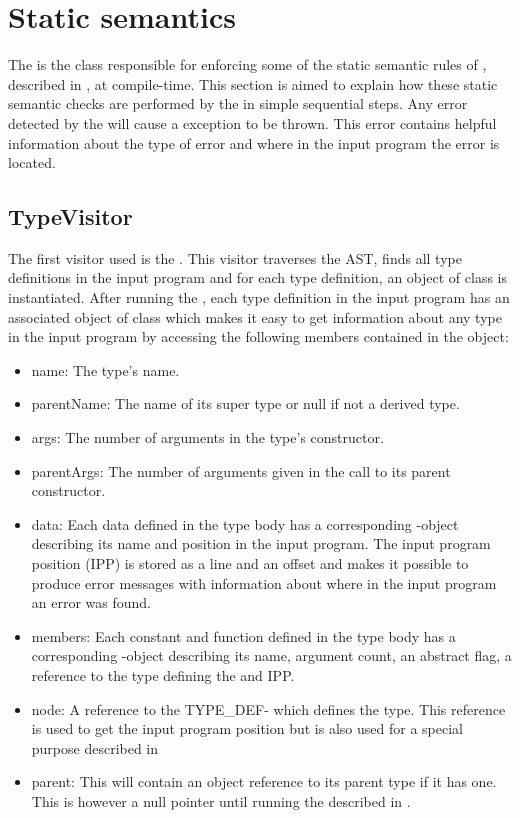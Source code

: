 \section{Static semantics}
The  is the class responsible for enforcing some of the static semantic rules of \productname{}, described in , at compile-time. This section is aimed to explain how these static semantic checks are performed by the  in simple sequential steps. Any error detected by the  will cause a  exception to be thrown. This error contains helpful information about the type of error and where in the input program the error is located. 

\subsection{TypeVisitor}
The first visitor used is the . This visitor traverses the AST, finds all type definitions in the input program and for each type definition, an object of class  is instantiated. After running the , each type definition in the input program has an associated object of class  which makes it easy to get information about any type in the input program by accessing the following members contained in the  object:
\begin{itemize}
\item {} name: The type's name.
\item {} parentName: The name of its super type or null if not a derived type.
\item {} args: The number of arguments in the type's constructor.
\item {} parentArgs: The number of arguments given in the call to its parent constructor.
\item {} data: Each data defined in the type body has a corresponding -object describing its name and position in the input program. The input program position (IPP) is stored as a line and an offset and makes it possible to produce error messages with information about where in the input program an error was found.
\item {} members: Each constant and function defined in the type body has a corresponding -object describing its name, argument count, an abstract flag, a  reference to the type defining the  and IPP.
\item {} node: A reference to the TYPE_DEF- which defines the type. This reference is used to get the input program position but is also used for a special purpose described in  
\item {} parent: This will contain an object reference to its parent type if it has one. This is however a null pointer until running the  described in .
\end{itemize}

